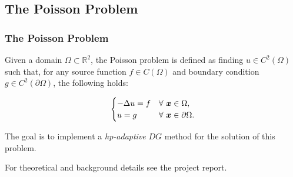 \subsection{The Poisson Problem}

\begin{frame}
    \frametitle{The Poisson Problem}

    Given a domain $\Omega \subset \mathbb{R}^2$, the Poisson problem is defined as finding \( u \in C^2(\Omega) \) such that, for any source function \( f \in C(\Omega) \) and boundary condition \( g \in C^2(\partial \Omega) \), the following holds:

    \begin{gather}
        \begin{cases} \label{strong_poisson}
            - \Delta u = f & \forall ~ \bm{x} \in \Omega, \\
            u = g & \forall ~ \bm{x} \in \partial \Omega.
        \end{cases}
    \end{gather}

    The goal is to implement a \textit{hp-adaptive} $DG$ method for the solution of this problem.

    For theoretical and background details see the project report.
\end{frame}